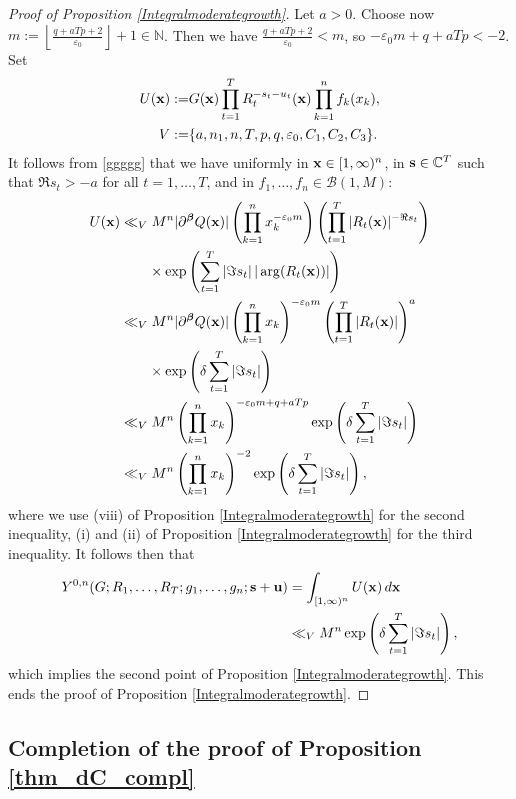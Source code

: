 \documentclass[a4paper,12pt]{article}
\theoremstyle{definition}
\numberwithin{equation}{section}
\def\N{{\mathbb N}}
\def\C{{\mathbb C}}
\def\s{{\bf s}}
\def\x{{\bf x}}
\def\u{{\bf u}}
\newcommand{\betab}{\boldsymbol{\beta}}
\newcommand{\dd}{d}
\def\eps{{\varepsilon}}
\let\ds=\displaystyle
\begin{document}
\begin{proof}[Proof of Proposition \ref{Integralmoderategrowth}]
Let $a >0$. Choose now $\ds m:=\left\lfloor \frac{q+aTp +2}{\eps_0}\right\rfloor +1\in \N$. 
Then we have 
$\displaystyle{\frac{q+aTp+2}{\eps_0}<{m}}$,
so $-\eps_0 m +q+aT p< -2$.   Set
\begin{align*}
U(\x):=&G(\x) \prod_{t=1}^T R_t^{-s_t-u_t} (\x) \prod_{k=1}^nf_k(x_k),\\
V:=&\{a,n_1,n, T, p, q, \eps_0, C_1, C_2, C_3\}.
\end{align*}
It follows from \eqref{ggggg} that we have uniformly in  $\x\in  [1,\infty)^n$, in $\s \in \C^T$ such that 
$\Re s_t>-a$ for all $t=1,\ldots, T$, and in $f_1,\ldots, f_n \in \mathcal B (1, M)$:
\begin{align*}
U(\x)&\ll_V M^n |\partial^{\betab} Q (\x)| \left(\prod_{k=1}^n x_k^{-\eps_0 m}\right) \left(\prod_{t=1}^T |R_t(\x)|^{-\Re s_t}\right)\\
& \qquad \times \exp \left(\sum_{t=1}^T |\Im s_t| \, |\arg (R_t(\x))|\right)\\
&\ll_V M^n |\partial^{\betab} Q (\x)| \left(\prod_{k=1}^n x_k\right)^{-\eps_0 m} \left(\prod_{t=1}^T |R_t(\x)|\right)^a\\
& \qquad \times \exp \left(\delta \sum_{t=1}^T |\Im s_t| \right)\\
&\ll_V M^n \left(\prod_{k=1}^n x_k\right)^{-\eps_0 m +q+a T p} \exp \left(\delta \sum_{t=1}^T |\Im s_t| \right)\\
&\ll_V  M^n \left(\prod_{k=1}^n x_k\right)^{-2} 
\exp \left(\delta \sum_{t=1}^T |\Im s_t| \right),
\end{align*}
where we use (viii) of Proposition
\ref{Integralmoderategrowth} for the second inequality, 
(i) and (ii) of Proposition \ref{Integralmoderategrowth} for the third inequality.
It follows then that 
\begin{align}\label{ggggg2}
Y^{0,n}(G; R_1, \ldots, R_T; g_1,\ldots,g_n; \s+\u)&=\int_{[1,\infty)^n} U(\x) \, \dd \x\notag\\
&\ll_V M^n \exp \left(\delta \sum_{t=1}^T |\Im s_t| \right),
\end{align}
which implies the second point of Proposition \ref{Integralmoderategrowth}. This ends the proof of Proposition \ref{Integralmoderategrowth}.
\end{proof}

\subsection{Completion of the proof of Proposition \ref{thm_dC_compl}}
\end{document}
